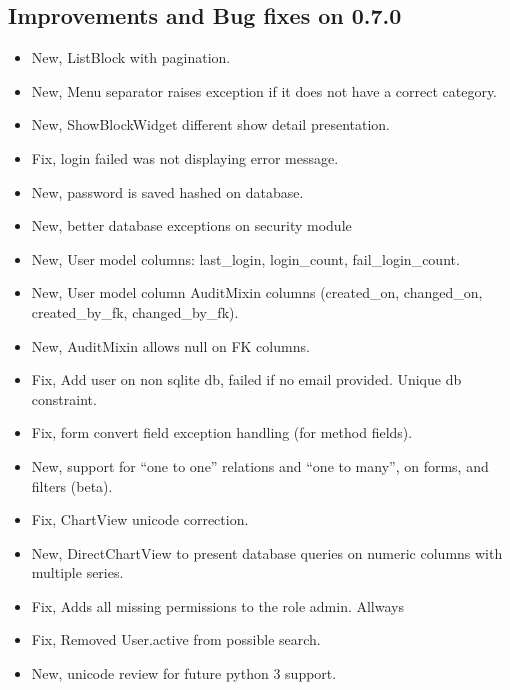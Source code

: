 \documentclass[letterpaper,10pt,english]{sphinxmanual}
\begin{document}
\subsection{Improvements and Bug fixes on 0.7.0}
\label{versions:improvements-and-bug-fixes-on-0-7-0}\begin{itemize}
\item {} 
New, ListBlock with pagination.

\item {} 
New, Menu separator raises exception if it does not have a correct category.

\item {} 
New, ShowBlockWidget different show detail presentation.

\item {} 
Fix, login failed was not displaying error message.

\item {} 
New, password is saved hashed on database.

\item {} 
New, better database exceptions on security module

\item {} 
New, User model columns: last\_login, login\_count, fail\_login\_count.

\item {} 
New, User model column AuditMixin columns (created\_on, changed\_on, created\_by\_fk, changed\_by\_fk).

\item {} 
New, AuditMixin allows null on FK columns.

\item {} 
Fix, Add user on non sqlite db, failed if no email provided. Unique db constraint.

\item {} 
Fix, form convert field exception handling (for method fields).

\item {} 
New, support for ``one to one'' relations and ``one to many'', on forms, and filters (beta).

\item {} 
Fix, ChartView unicode correction.

\item {} 
New, DirectChartView to present database queries on numeric columns with multiple series.

\item {} 
Fix, Adds all missing permissions to the role admin. Allways

\item {} 
Fix, Removed User.active from possible search.

\item {} 
New, unicode review for future python 3 support.

\end{itemize}
\end{document}
